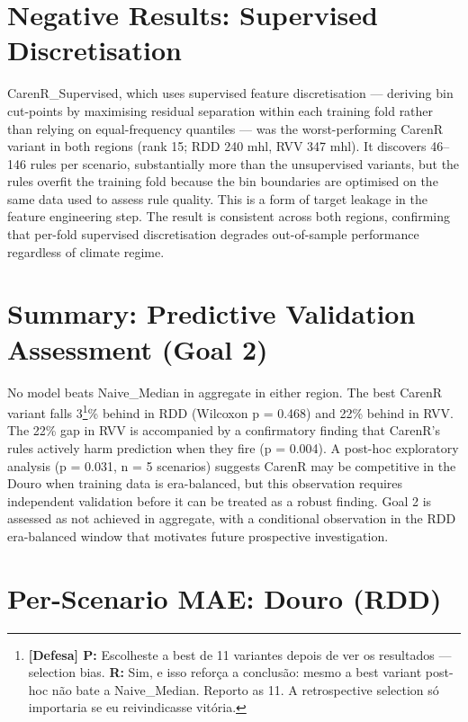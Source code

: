 \section{Negative Results: Supervised Discretisation}\label{sec:negative_results_supervised_discretisation}

CarenR\_Supervised, which uses supervised feature discretisation --- deriving bin cut-points by maximising residual separation within each training fold rather than relying on equal-frequency quantiles --- was the worst-performing CarenR variant in both regions (rank 15; RDD 240 mhl, RVV 347 mhl). It discovers 46--146 rules per scenario, substantially more than the unsupervised variants, but the rules overfit the training fold because the bin boundaries are optimised on the same data used to assess rule quality. This is a form of target leakage in the feature engineering step. The result is consistent across both regions, confirming that per-fold supervised discretisation degrades out-of-sample performance regardless of climate regime.


\section{Summary: Predictive Validation Assessment (Goal 2)}\label{sec:summary_of_goal_2}

No model beats Naive\_Median in aggregate in either region. The best CarenR variant falls 3\footnote{\textbf{[Defesa] P:} Escolheste a best de 11 variantes depois de ver os resultados --- selection bias. \textbf{R:} Sim, e isso reforça a conclusão: mesmo a best variant post-hoc não bate a Naive\_Median. Reporto as 11. A retrospective selection só importaria se eu reivindicasse vitória.}\% behind in RDD (Wilcoxon p = 0.468) and 22\% behind in RVV. The 22\% gap in RVV is accompanied by a confirmatory finding that CarenR's rules actively harm prediction when they fire (p = 0.004). A post-hoc exploratory analysis (p = 0.031, n = 5 scenarios) suggests CarenR may be competitive in the Douro when training data is era-balanced, but this observation requires independent validation before it can be treated as a robust finding. Goal 2 is assessed as not achieved in aggregate, with a conditional observation in the RDD era-balanced window that motivates future prospective investigation.




\section{Per-Scenario MAE: Douro (RDD)}\label{sec:perscenario_mae_douro_rdd}

